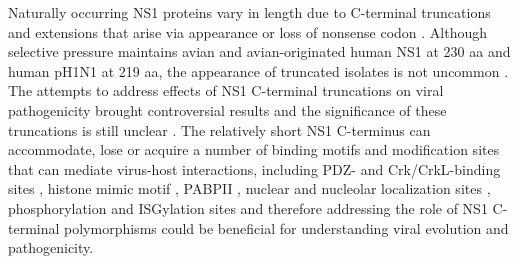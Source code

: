 		Naturally occurring \gls{NS1} proteins vary in length due to C-terminal truncations and extensions that arise via appearance or loss of nonsense codon \parencite{Parvin1983}. Although selective pressure maintains avian and avian-originated human \gls{NS1} at 230 aa and human pH1N1 at 219 aa, the appearance of truncated isolates is not uncommon \parencite{Suarez1998, Lakspere2014}. The attempts to address effects of   \gls{NS1} C-terminal truncations on viral pathogenicity brought controversial results and the significance of these truncations is still unclear \parencite{Hale2010e, Tu2011a}. The relatively short NS1 C-terminus can accommodate, lose or acquire a number of binding motifs and modification sites that can mediate virus-host interactions, including PDZ- and Crk/CrkL-binding sites \parencite{Heikkinen2008, Liu2010}, histone mimic motif \parencite{Marazzi2012}, \gls{PABP}II  \parencite{Li2001a}, nuclear and nucleolar localization sites \parencite{Melen2012}, phosphorylation \parencite{Hsiang2012} and \gls{ISG}ylation sites \parencite{Hsiang2009} and therefore addressing the role of NS1 C-terminal polymorphisms could be beneficial for understanding viral evolution and pathogenicity.
		
		
		
		
		
		
		
		
		
				
		
		
